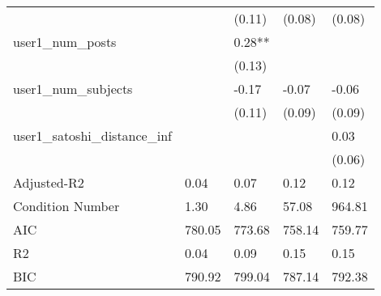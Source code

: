 \begin{table}
\begin{center}
\begin{tabular}{lllll}
                                               &         & (0.11)   & (0.08)  & (0.08)   \\
user1_num_posts                                &         & 0.28**   &         &          \\
                                               &         & (0.13)   &         &          \\
user1_num_subjects                             &         & -0.17    & -0.07   & -0.06    \\
                                               &         & (0.11)   & (0.09)  & (0.09)   \\
user1_satoshi_distance_inf                     &         &          &         & 0.03     \\
                                               &         &          &         & (0.06)   \\
Adjusted-R2                                    & 0.04    & 0.07     & 0.12    & 0.12     \\
Condition Number                               & 1.30    & 4.86     & 57.08   & 964.81   \\
AIC                                            & 780.05  & 773.68   & 758.14  & 759.77   \\
R2                                             & 0.04    & 0.09     & 0.15    & 0.15     \\
BIC                                            & 790.92  & 799.04   & 787.14  & 792.38   \\
\hline
\end{tabular}
\end{center}
\end{table}